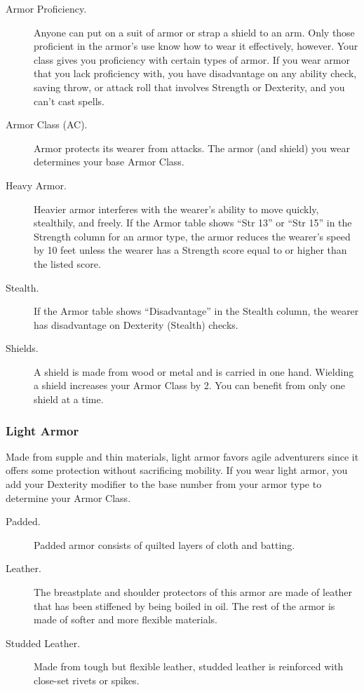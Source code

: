 \begin{description}
\item[Armor Proficiency.]
Anyone can put on a suit of armor or strap a shield to an arm. Only
those proficient in the armor's use know how to wear it effectively,
however. Your class gives you proficiency with certain types of armor.
If you wear armor that you lack proficiency with, you have disadvantage
on any ability check, saving throw, or attack roll that involves
Strength or Dexterity, and you can't cast spells.
\item[Armor Class (AC).]
Armor protects its wearer from attacks. The armor (and shield) you wear
determines your base Armor Class.
\item[Heavy Armor.]
Heavier armor interferes with the wearer's ability to move quickly,
stealthily, and freely. If the Armor table shows ``Str 13'' or ``Str
15'' in the Strength column for an armor type, the armor reduces the
wearer's speed by 10 feet unless the wearer has a Strength score equal
to or higher than the listed score.
\item[Stealth.]
If the Armor table shows ``Disadvantage'' in the Stealth column, the
wearer has disadvantage on Dexterity (Stealth) checks.
\item[Shields.]
A shield is made from wood or metal and is carried in one hand. Wielding
a shield increases your Armor Class by 2. You can benefit from only one
shield at a time.
\end{description}

\subsubsection{Light Armor}\label{_light_armor}

Made from supple and thin materials, light armor favors agile
adventurers since it offers some protection without sacrificing
mobility. If you wear light armor, you add your Dexterity modifier to
the base number from your armor type to determine your Armor Class.

\begin{description}
\item[Padded.]
Padded armor consists of quilted layers of cloth and batting.
\item[Leather.]
The breastplate and shoulder protectors of this armor are made of
leather that has been stiffened by being boiled in oil. The rest of the
armor is made of softer and more flexible materials.
\item[Studded Leather.]
Made from tough but flexible leather, studded leather is reinforced with
close-set rivets or spikes.
\end{description}

